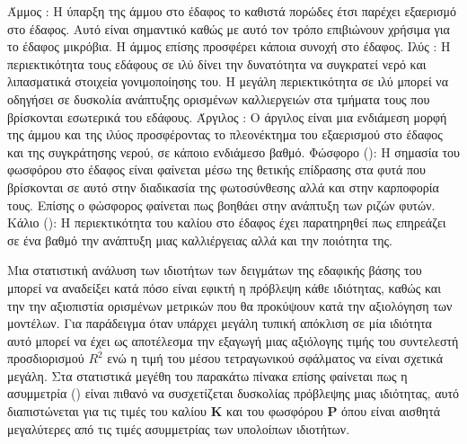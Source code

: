 \begin{outline}
        \2 Άμμος : Η ύπαρξη της άμμου στο έδαφος το καθιστά πορώδες έτσι παρέχει εξαερισμό στο έδαφος. Αυτό είναι σημαντικό καθώς με αυτό τον τρόπο επιβιώνουν χρήσιμα για το έδαφος μικρόβια. Η άμμος επίσης προσφέρει κάποια συνοχή στο έδαφος.
        \2 Ιλύς : Η περιεκτικότητα τους εδάφους σε ιλύ δίνει την δυνατότητα να συγκρατεί νερό και λιπασματικά στοιχεία γονιμοποίησης του. Η μεγάλη περιεκτικότητα σε ιλύ μπορεί να οδηγήσει σε δυσκολία ανάπτυξης ορισμένων καλλιεργειών στα τμήματα τους που βρίσκονται εσωτερικά του εδάφους.
        \2 Άργιλος : Ο άργιλος είναι μια ενδιάμεση μορφή της άμμου και της ιλύος προσφέροντας το πλεονέκτημα του εξαερισμού στο έδαφος και της συγκράτησης νερού, σε κάποιο ενδιάμεσο βαθμό.
    \1 Φώσφορο (): Η σημασία του φωσφόρου στο έδαφος είναι φαίνεται μέσω της θετικής επίδρασης στα φυτά που βρίσκονται σε αυτό στην διαδικασία της φωτοσύνθεσης αλλά και στην καρποφορία τους. Επίσης ο φώσφορος φαίνεται πως βοηθάει στην ανάπτυξη των ριζών φυτών.
    \1 Κάλιο (): Η περιεκτικότητα του καλίου στο έδαφος έχει παρατηρηθεί πως επηρεάζει σε ένα βαθμό την ανάπτυξη μιας καλλιέργειας αλλά και την ποιότητα της.
\end{outline}
Μια στατιστική ανάλυση των ιδιοτήτων των δειγμάτων της εδαφικής βάσης του  μπορεί να αναδείξει κατά πόσο είναι εφικτή η πρόβλεψη κάθε ιδιότητας, καθώς και την την αξιοπιστία ορισμένων μετρικών που θα προκύψουν κατά την αξιολόγηση των μοντέλων. Για παράδειγμα όταν υπάρχει μεγάλη τυπική απόκλιση σε μία ιδιότητα αυτό μπορεί να έχει ως αποτέλεσμα την εξαγωγή μιας αξιόλογης τιμής του συντελεστή προσδιορισμού $R^2$ ενώ η τιμή του μέσου τετραγωνικού σφάλματος να είναι σχετικά μεγάλη. Στα στατιστικά μεγέθη του παρακάτω πίνακα επίσης φαίνεται πως η ασυμμετρία () είναι πιθανό να συσχετίζεται δυσκολίας πρόβλεψης μιας ιδιότητας, αυτό διαπιστώνεται για τις τιμές του καλίου $\mathbf{K}$ και του φωσφόρου $\mathbf{P}$ όπου είναι αισθητά μεγαλύτερες από τις τιμές ασυμμετρίας των υπολοίπων ιδιοτήτων. \\

